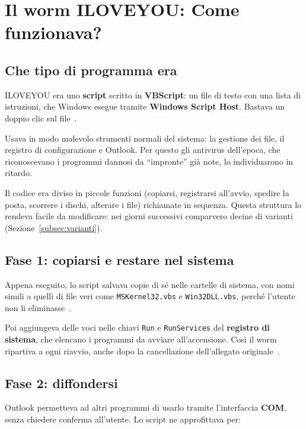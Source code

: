 \section{Il worm ILOVEYOU: Come funzionava?}

\subsection{Che tipo di programma era}

ILOVEYOU era uno \textbf{script} scritto in \textbf{VBScript}: un file di testo con una lista di istruzioni, che Windows esegue tramite \textbf{Windows Script Host}. Bastava un doppio clic sul file~\cite{bishop2000}.

Usava in modo malevolo strumenti normali del sistema: la gestione dei file, il registro di configurazione e Outlook. Per questo gli antivirus dell'epoca, che riconoscevano i programmi dannosi da ``impronte'' già note, lo individuarono in ritardo.

Il codice era diviso in piccole funzioni (copiarsi, registrarsi all'avvio, spedire la posta, scorrere i dischi, alterare i file) richiamate in sequenza. Questa struttura lo rendeva facile da modificare: nei giorni successivi comparvero decine di varianti (Sezione~\ref{subsec:varianti}).

\subsection{Fase 1: copiarsi e restare nel sistema}\label{subsec:fase1}

Appena eseguito, lo script salvava copie di sé nelle cartelle di sistema, con nomi simili a quelli di file veri come \texttt{MSKernel32.vbs} e \texttt{Win32DLL.vbs}, perché l'utente non li eliminasse~\cite{bishop2000}.

Poi aggiungeva delle voci nelle chiavi \texttt{Run} e \texttt{RunServices} del \textbf{registro di sistema}, che elencano i programmi da avviare all'accensione. Così il worm ripartiva a ogni riavvio, anche dopo la cancellazione dell'allegato originale~\cite{cert2000}.

\subsection{Fase 2: diffondersi}\label{subsec:fase2}

Outlook permetteva ad altri programmi di usarlo tramite l'interfaccia \textbf{COM}, senza chiedere conferma all'utente. Lo script ne approfittava per:


